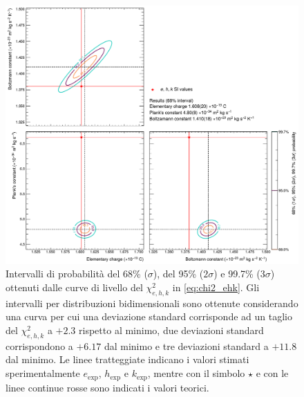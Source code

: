 \documentclass[a4paper, varvw, nofootinbib]{revtex4-2}
\begin{document}
\begin{figure}
\centering
\includegraphics[width=15cm]{fig/ehk_contour_plot_68}
\caption{Intervalli di probabilità del 68\% ($\sigma$), del 95\% ($2\sigma$) e 99.7\% ($3\sigma$) ottenuti dalle curve di livello del $\chi^2_{e,h,k}$ in \eqref{eq:chi2_ehk}. Gli intervalli per distribuzioni bidimensionali sono ottenute considerando una curva per cui una deviazione standard corrisponde ad un taglio del $\chi^2_{e,h,k}$ a $+2.3$ rispetto al minimo, due deviazioni standard corrispondono a $+6.17$ dal minimo e tre deviazioni standard a $+11.8$ dal minimo. Le linee tratteggiate indicano i valori stimati sperimentalmente $e_\text{exp}$, $h_\text{exp}$ e $k_\text{exp}$, mentre con il simbolo $\star$ e con le linee continue rosse sono indicati i valori teorici.}\label{fig:3}
\end{figure}




\end{document}

